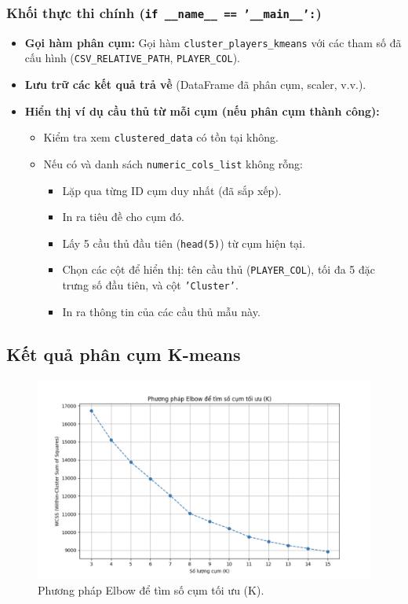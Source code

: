 \documentclass[12pt, a4paper]{report}
\begin{document}
\subsubsection*{Khối thực thi chính (\texttt{if \_\_name\_\_ == '\_\_main\_\_':})}
\begin{itemize}
    \item \textbf{Gọi hàm phân cụm:} Gọi hàm \texttt{cluster\_players\_kmeans} với các tham số đã cấu hình (\texttt{CSV\_RELATIVE\_PATH}, \texttt{PLAYER\_COL}).
    \item \textbf{Lưu trữ các kết quả trả về} (DataFrame đã phân cụm, scaler, v.v.).
    \item \textbf{Hiển thị ví dụ cầu thủ từ mỗi cụm (nếu phân cụm thành công):}
    \begin{itemize}
        \item Kiểm tra xem \texttt{clustered\_data} có tồn tại không.
        \item Nếu có và danh sách \texttt{numeric\_cols\_list} không rỗng:
        \begin{itemize}
            \item Lặp qua từng ID cụm duy nhất (đã sắp xếp).
            \item In ra tiêu đề cho cụm đó.
            \item Lấy 5 cầu thủ đầu tiên (\texttt{head(5)}) từ cụm hiện tại.
            \item Chọn các cột để hiển thị: tên cầu thủ (\texttt{PLAYER\_COL}), tối đa 5 đặc trưng số đầu tiên, và cột \texttt{'Cluster'}.
            \item In ra thông tin của các cầu thủ mẫu này.
        \end{itemize}
    \end{itemize}
\end{itemize}

\subsection{Kết quả phân cụm K-means}


\begin{figure}[H]
    \centering
    \includegraphics[width=\textwidth]{Elbow.png}
    \caption{Phương pháp Elbow để tìm số cụm tối ưu (K).}
    \label{fig:elbow_method}
\end{figure}
\end{document}
